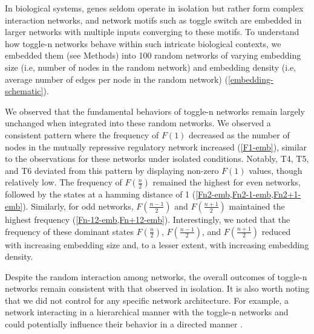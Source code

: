 \documentclass[11pt,a4paper]{article}
\theoremstyle{definition}
\theoremstyle{remark}
\begin{document}
In biological systems, genes seldom operate in isolation but rather form complex interaction networks, and network motifs such as toggle switch are embedded in larger networks with multiple inputs converging to these motifs. To understand how toggle-n networks behave within such intricate biological contexts, we embedded them (see Methods) into 100 random networks of varying embedding size (i.e, number of nodes in the random network) and embedding density (i.e, average number of edges per node in the random network) (\cref{embedding-schematic}). 

We observed that the fundamental behaviors of toggle-n networks remain largely unchanged when integrated into these random networks. We observed a consistent pattern where the frequency of $F(1)$ decreased as the number of nodes in the mutually repressive regulatory network increased (\cref{F1-emb}), similar to the observations for these networks under isolated conditions. Notably, T4, T5, and T6 deviated from this pattern by displaying non-zero $F(1)$ values, though relatively low. The frequency of $F(\frac{n}{2})$ remained the highest for even networks, followed by the states at a hamming distance of 1 (\cref{Fn2-emb,Fn2-1-emb,Fn2+1-emb}). Similarly, for odd networks, $F(\frac{n-1}{2})$ and $F(\frac{n+1}{2})$ maintained the highest frequency (\cref{Fn-12-emb,Fn+12-emb}). Interestingly, we noted that the frequency of these dominant states $F(\frac{n}{2})$, $F(\frac{n-1}{2})$, and $F(\frac{n+1}{2})$ reduced with increasing embedding size and, to a lesser extent, with increasing embedding density.

Despite the random interaction among networks, the overall outcomes of toggle-n networks remain consistent with that observed in isolation.  It is also worth noting that we did not control for any specific network architecture. For example, a network interacting in a hierarchical manner with the toggle-n networks and could potentially influence their behavior in a directed manner \parencite{krumsiek_hierarchical_2011, peter_assessing_2017}.
\end{document}
